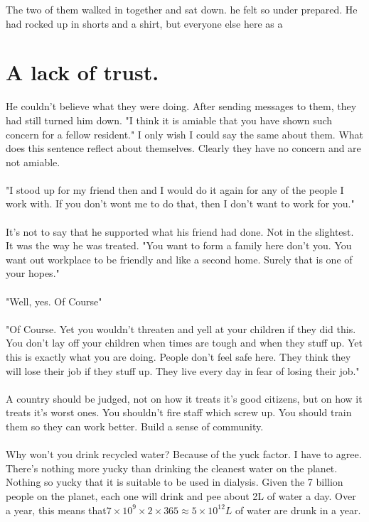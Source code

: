 \documentclass[12pt, a4paper]{book}
\begin{document}
The two of them walked in together and sat down. he felt so under prepared. He had rocked up in shorts and a shirt, but everyone else here as a 


\chapter{A lack of trust.}
He couldn't believe what they were doing. After sending messages to them, they had still turned him down. "I think it is amiable that you have shown such concern for a fellow resident." I only wish I could say the same about them. What does this sentence reflect about themselves. Clearly they have no concern and are not amiable. 
\\\\
"I stood up for my friend then and I would do it again for any of the people I work with. If you don't wont me to do that, then I don't want to work for you."
\\\\
It's not to say that he supported what his friend had done. Not in the slightest. It was the way he was treated. "You want to form a family here don't you. You want out workplace to be friendly and like a second home. Surely that is one of your hopes."
\\\\
"Well, yes. Of Course"
\\\\
"Of Course. Yet you wouldn't threaten and yell at your children if they did this. You don't lay off your children when times are tough and when they stuff up. Yet this is exactly what you are doing. People don't feel safe here. They think they will lose their job if they stuff up. They live every day in fear of losing their job."
\\\\
A country should be judged, not on how it treats it's good citizens, but on how it treats it's worst ones. You shouldn't fire staff which screw up. You should train them so they can work better. Build a sense of community. 
\\\\
Why won't you drink recycled water? Because of the yuck factor. I have to agree. There's nothing more yucky than drinking the cleanest water on the planet. Nothing so yucky that it is suitable to be used in dialysis. Given the 7 billion people on the planet, each one will drink and pee about 2L of water a day. Over a year, this means that$7 \times 10^9 \times 2 \times 365 \approx 5 \times 10^{12} L$ of water are drunk in a year. 
\end{document}

